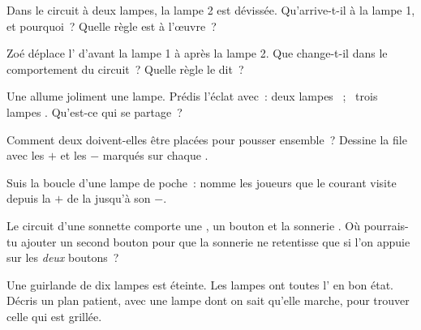 \begin{exercise}[$\star$]\label{exo:g4:series-circuits:3}
Dans le circuit à deux lampes, la lampe 2 est dévissée. Qu'arrive-t-il
à la lampe 1, et pourquoi~? Quelle règle est à l'œuvre~?
\end{exercise}

\begin{exercise}[$\star$]\label{exo:g4:series-circuits:4}
Zoé déplace l' d'avant la lampe 1 à après la lampe 2. Que
change-t-il dans le comportement du circuit~? Quelle règle le dit~?
\end{exercise}

\begin{exercise}[$\star$]\label{exo:g4:series-circuits:5}
Une  allume joliment une lampe. Prédis l'éclat avec~: deux lampes
~; \ trois lampes . Qu'est-ce qui se partage~?
\end{exercise}

\begin{exercise}[$\star$]\label{exo:g4:series-circuits:6}
Comment deux  doivent-elles être placées pour pousser ensemble~?
Dessine la file avec les $+$ et les $-$ marqués sur chaque .
\end{exercise}

\begin{exercise}[$\star$]\label{exo:g4:series-circuits:7}
Suis la boucle d'une lampe de poche~: nomme les joueurs que le
courant visite depuis la  $+$ de la  jusqu'à son $-$.
\end{exercise}

\begin{exercise}[$\star$]\label{exo:g4:series-circuits:8}
Le circuit d'une sonnette comporte une , un bouton et la sonnerie
. Où pourrais-tu ajouter un second bouton pour que la
sonnerie ne retentisse que si l'on appuie sur les \emph{deux}
boutons~?
\end{exercise}

\begin{exercise}[$\star$]\label{exo:g4:series-circuits:9}
Une guirlande de dix lampes  est éteinte. Les lampes ont
toutes l' en bon état. Décris un plan patient, avec une lampe dont
on sait qu'elle marche, pour trouver celle qui est grillée.
\end{exercise}

